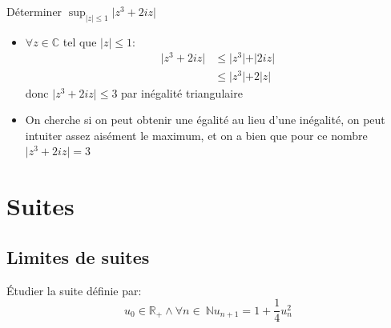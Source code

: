 \documentclass{article}
\begin{document}
\begin{exercise}
    Déterminer $\sup_{\lvert z \lvert \leq 1} \lvert z^3+2iz\lvert$
\end{exercise}
\begin{solution}
    \begin{itemize}
        \item $\forall z \in \mathbb{C}$ tel que $\lvert z \lvert \leq 1$:
    \begin{align*}
        \lvert z^3+2iz \lvert &\leq \lvert z^3 \lvert +\lvert 2iz \lvert \\
                              &\leq \lvert z^3 \lvert +2 \lvert z \lvert 
    \end{align*}
    donc $\lvert z^3+2iz \lvert \leq 3$ par inégalité triangulaire
\item On cherche si on peut obtenir une égalité au lieu d'une inégalité, on peut intuiter assez aisément le maximum, et on a bien que pour ce nombre $\lvert z^3+2iz \lvert =3$
    \end{itemize}
\end{solution}

\section{Suites}%
\label{sec:Suites}
\subsection{Limites de suites}%
\begin{exercise}
    Étudier la suite définie par: \[
        u_0 \in \mathbb{R}_+ \land \forall n \in~\mathbb{N} u_{n+1} = 1+\frac{1}{4}u_n^2
    \]
\end{exercise}
\end{document}
